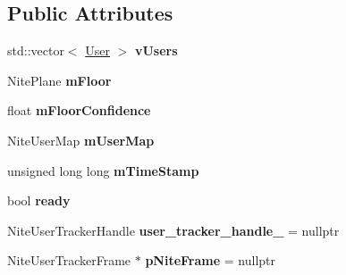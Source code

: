 \subsection*{\-Public \-Attributes}
\begin{DoxyCompactItemize}
\item 
\hypertarget{structs9_1_1oni_1_1OpenNISkeleton_1_1SharedObject_aea5240411a6e16bb8d0966d779517d39}{std\-::vector$<$ \hyperlink{structs9_1_1oni_1_1OpenNISkeleton_1_1User}{\-User} $>$ {\bfseries v\-Users}}\label{structs9_1_1oni_1_1OpenNISkeleton_1_1SharedObject_aea5240411a6e16bb8d0966d779517d39}

\item 
\hypertarget{structs9_1_1oni_1_1OpenNISkeleton_1_1SharedObject_a3014853d574a6b653bfdcb002f91e35f}{\-Nite\-Plane {\bfseries m\-Floor}}\label{structs9_1_1oni_1_1OpenNISkeleton_1_1SharedObject_a3014853d574a6b653bfdcb002f91e35f}

\item 
\hypertarget{structs9_1_1oni_1_1OpenNISkeleton_1_1SharedObject_aec41eb82cf7720c309867567b2dc88c6}{float {\bfseries m\-Floor\-Confidence}}\label{structs9_1_1oni_1_1OpenNISkeleton_1_1SharedObject_aec41eb82cf7720c309867567b2dc88c6}

\item 
\hypertarget{structs9_1_1oni_1_1OpenNISkeleton_1_1SharedObject_a10accd1a30a6fed672daad59f32727df}{\-Nite\-User\-Map {\bfseries m\-User\-Map}}\label{structs9_1_1oni_1_1OpenNISkeleton_1_1SharedObject_a10accd1a30a6fed672daad59f32727df}

\item 
\hypertarget{structs9_1_1oni_1_1OpenNISkeleton_1_1SharedObject_a09409c458ec0518b7ee20349cc8c748c}{unsigned long long {\bfseries m\-Time\-Stamp}}\label{structs9_1_1oni_1_1OpenNISkeleton_1_1SharedObject_a09409c458ec0518b7ee20349cc8c748c}

\item 
\hypertarget{structs9_1_1oni_1_1OpenNISkeleton_1_1SharedObject_a734226d165337262ccf9da01789e3a13}{bool {\bfseries ready}}\label{structs9_1_1oni_1_1OpenNISkeleton_1_1SharedObject_a734226d165337262ccf9da01789e3a13}

\item 
\hypertarget{structs9_1_1oni_1_1OpenNISkeleton_1_1SharedObject_ae14e0be94b65e2818e44d8c417da85b4}{\-Nite\-User\-Tracker\-Handle {\bfseries user\-\_\-tracker\-\_\-handle\-\_\-} = nullptr}\label{structs9_1_1oni_1_1OpenNISkeleton_1_1SharedObject_ae14e0be94b65e2818e44d8c417da85b4}

\item 
\hypertarget{structs9_1_1oni_1_1OpenNISkeleton_1_1SharedObject_a0e224cc91eefccfcd3d454d3fe116288}{\-Nite\-User\-Tracker\-Frame $\ast$ {\bfseries p\-Nite\-Frame} = nullptr}\label{structs9_1_1oni_1_1OpenNISkeleton_1_1SharedObject_a0e224cc91eefccfcd3d454d3fe116288}


\end{DoxyCompactItemize}
